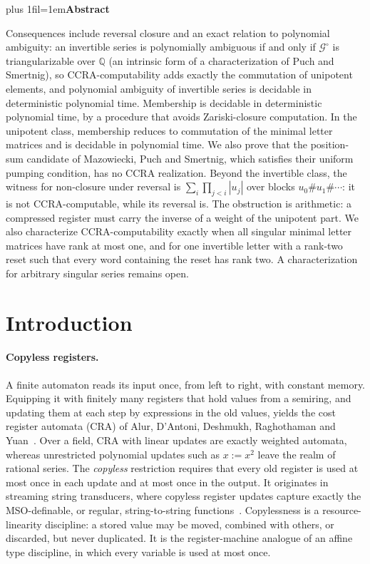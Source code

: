 \documentclass[11pt,letterpaper]{article}
\renewenvironment{abstract}{\par\medskip\normalsize\leftskip=0pt\rightskip=0pt\parfillskip=0pt plus 1fil\parindent=1em\noindent\textbf{Abstract}\par\medskip\ignorespaces}{\par}
\newcommand{\Q}{\mathbb{Q}}
\newcommand{\cG}{\mathcal{G}}
\theoremstyle{definition}
\begin{document}
\begin{titlepage}
\begin{abstract}
Consequences include reversal closure and an exact relation to polynomial ambiguity: an invertible series is polynomially ambiguous if and only if $\cG^\circ$ is triangularizable over $\Q$ (an intrinsic form of a characterization of Puch and Smertnig), so CCRA-computability adds exactly the commutation of unipotent elements, and polynomial ambiguity of invertible series is decidable in deterministic polynomial time. Membership is decidable in deterministic polynomial time, by a procedure that avoids Zariski-closure computation. In the unipotent class, membership reduces to commutation of the minimal letter matrices and is decidable in polynomial time. We also prove that the position-sum candidate of Mazowiecki, Puch and Smertnig, which satisfies their uniform pumping condition, has no CCRA realization. Beyond the invertible class, the witness for non-closure under reversal is $\sum_{i}\prod_{j<i}|u_j|$ over blocks $u_0\#u_1\#\cdots$: it is not CCRA-computable, while its reversal is. The obstruction is arithmetic: a compressed register must carry the inverse of a weight of the unipotent part. We also characterize CCRA-computability exactly when all singular minimal letter matrices have rank at most one, and for one invertible letter with a rank-two reset such that every word containing the reset has rank two. A characterization for arbitrary singular series remains open.
\end{abstract}
\end{titlepage}
\thispagestyle{empty}
{\small\hypersetup{linkcolor=black}\tableofcontents}
\thispagestyle{empty}
\clearpage
\setcounter{page}{1}

\section{Introduction}\label{sec:intro}
\paragraph{Copyless registers.}
A finite automaton reads its input once, from left to right, with constant memory. Equipping it with finitely many registers that hold values from a semiring, and updating them at each step by expressions in the old values, yields the cost register automata (CRA) of Alur, D'Antoni, Deshmukh, Raghothaman and Yuan~\cite{ADDRY13}. Over a field, CRA with linear updates are exactly weighted automata, whereas unrestricted polynomial updates such as $x:=x^2$ leave the realm of rational series. The \emph{copyless} restriction requires that every old register is used at most once in each update and at most once in the output. It originates in streaming string transducers, where copyless register updates capture exactly the MSO-definable, or regular, string-to-string functions~\cite{AC10,AC11}. Copylessness is a resource-linearity discipline: a stored value may be moved, combined with others, or discarded, but never duplicated. It is the register-machine analogue of an affine type discipline, in which every variable is used at most once.
\end{document}
